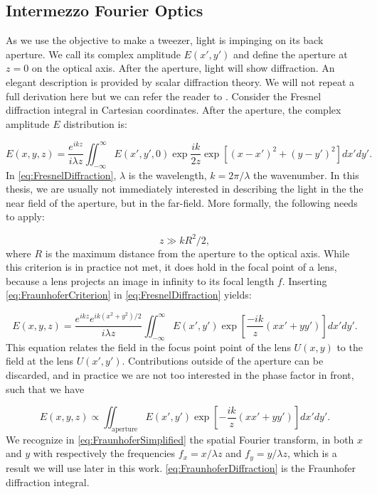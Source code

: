 \begin{mdframed}
    \subsection*{Intermezzo Fourier Optics}
    
    As we use the objective to make a tweezer, light is impinging on its back aperture. 
    We call its complex amplitude $E(x',y')$ and define the aperture at $z = 0$ on the optical axis.
    After the aperture, light will show diffraction. 
    An elegant description is provided by scalar diffraction theory.
    We will not repeat a full derivation here but we can refer the reader to \cite{Goodman2005}.
    Consider the Fresnel diffraction integral in Cartesian coordinates. 
    After the aperture, the complex amplitude $E$ distribution is:
    
    \begin{equation}\label{eq:FresnelDiffraction}
        E(x,y,z) = 
        \frac{e^{ikz}}{i \lambda z} \iint_{-\infty}^{\infty} E(x',y',0) \exp{\frac{ik}{2z}} \exp{\left[(x-x')^2+(y-y')^2\right]} dx'dy'.
    \end{equation}
    In \cref{eq:FresnelDiffraction}, $\lambda$ is the wavelength, $k=2\pi/\lambda$ the wavenumber.
    In this thesis, we are usually not immediately interested in describing the light in the the near field of the aperture, but in the far-field. 
    More formally, the following needs to apply:
    
    \begin{equation}\label{eq:FraunhoferCriterion}
        z \gg k R^2/2,
    \end{equation}
    where $R$ is the maximum distance from the aperture to the optical axis. 
    While this criterion is in practice not met, it does hold in the focal point of a lens, because a lens projects an image in infinity to its focal length $f$. 
    Inserting \cref{eq:FraunhoferCriterion} in \cref{eq:FresnelDiffraction} yields:
    
    \begin{equation}\label{eq:FraunhoferDiffraction}
        E(x, y, z)=\frac{e^{i k z} e^{i k\left(x^{2}+y^{2}\right)/2}}{i \lambda z} \iint_{-\infty}^{\infty} E(x', y') \exp \left[\frac{-ik}{z}(x x'+y y')\right] dx' dy'.
    \end{equation}
    This equation relates the field in the focus point point of the lens $U(x,y)$ to the field at the lens $U(x',y')$. 
    Contributions outside of the aperture can be discarded, and in practice we are not too interested in the phase factor in front, such that we have
    
    \begin{equation}\label{eq:FraunhoferSimplified}
        E(x,y,z) \propto 
        \iint_{\text{aperture}} E(x',y') \exp{\left[- \frac{ik}{z}(xx'+yy')\right]}dx'dy'.
    \end{equation}
    We recognize in \cref{eq:FraunhoferSimplified} the spatial Fourier transform, in both $x$ and $y$ with respectively the frequencies $f_x = x/\lambda z$ and $f_y = y/\lambda z$, which is a result we will use later in this work. \cref{eq:FraunhoferDiffraction} is the Fraunhofer diffraction integral.
\end{mdframed}
